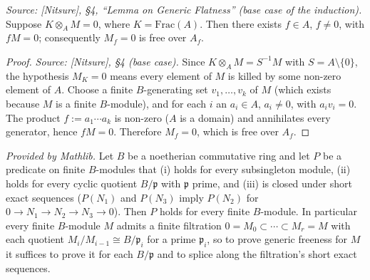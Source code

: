\begin{lemma}\leanok
[L1 — torsion base case \(M_K = 0\)]
  \label{lem:gf_torsion_base}
  \textit{Source: [Nitsure], \S4, ``Lemma on Generic Flatness'' (base case of the
  induction).}
  Suppose \(K \otimes_A M = 0\), where \(K = \mathrm{Frac}(A)\). Then there exists
  \(f \in A\), \(f \ne 0\), with \(f M = 0\); consequently \(M_f = 0\) is free over
  \(A_f\).
\end{lemma}

\begin{proof}


\leanok
  \textit{Source: [Nitsure], \S4 (base case).}
  Since \(K \otimes_A M = S^{-1}M\) with \(S = A \setminus \{0\}\), the hypothesis
  \(M_K = 0\) means every element of \(M\) is killed by some non-zero element of
  \(A\). Choose a finite \(B\)-generating set \(v_1, \dots, v_k\) of \(M\) (which
  exists because \(M\) is a finite \(B\)-module), and for each \(i\) an
  \(a_i \in A\), \(a_i \ne 0\), with \(a_i v_i = 0\). The product
  \(f := a_1 \cdots a_k\) is non-zero (\(A\) is a domain) and annihilates every
  generator, hence \(f M = 0\). Therefore \(M_f = 0\), which is free over \(A_f\).
\end{proof}

\begin{lemma}
  \label{lem:noeth_prime_filtration}
  \mathlibok
  \textit{Provided by Mathlib.}
  Let \(B\) be a noetherian commutative ring and let \(P\) be a predicate on finite
  \(B\)-modules that (i) holds for every subsingleton module, (ii) holds for every
  cyclic quotient \(B/\mathfrak{p}\) with \(\mathfrak{p}\) prime, and (iii) is
  closed under short exact sequences (\(P(N_1)\) and \(P(N_3)\) imply \(P(N_2)\)
  for \(0 \to N_1 \to N_2 \to N_3 \to 0\)). Then \(P\) holds for every finite
  \(B\)-module. In particular every finite \(B\)-module \(M\) admits a finite
  filtration \(0 = M_0 \subset \cdots \subset M_r = M\) with each quotient
  \(M_i / M_{i-1} \cong B/\mathfrak{p}_i\) for a prime \(\mathfrak{p}_i\), so to
  prove generic freeness for \(M\) it suffices to prove it for each
  \(B/\mathfrak{p}\) and to splice along the filtration's short exact sequences.
\end{lemma}

